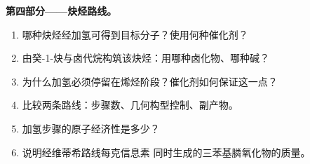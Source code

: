 \begin{problem}
\medskip
\noindent\textbf{第四部分——炔烃路线。}
\begin{enumerate}[resume]
  \item 哪种炔烃经加氢可得到目标分子？使用何种催化剂？
  \item 由癸-1-炔与卤代烷构筑该炔烃：用哪种卤化物、哪种碱？
  \item 为什么加氢必须停留在烯烃阶段？催化剂如何保证这一点？
  \item 比较两条路线：步骤数、几何构型控制、副产物。
  \item 加氢步骤的原子经济性是多少？
  \item 说明经维蒂希路线每克信息素
        同时生成的三苯基膦氧化物的质量。
\end{enumerate}
\end{problem}
